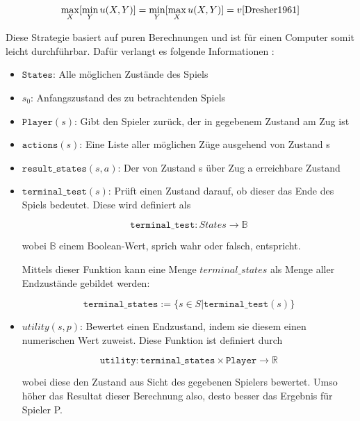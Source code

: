 \begin{equation}
\max\limits_X[\min\limits_Yu(X,Y)] = \min\limits_Y[\max\limits_Xu(X,Y)] = v \cite{Dresher1961}
\end{equation}

Diese Strategie basiert auf puren Berechnungen und ist für einen Computer somit leicht durchführbar. Dafür verlangt es folgende Informationen \cite{Stroetmann2018}:

\begin{itemize}
\item \textbf{$\mathtt{States}$}: Alle möglichen Zustände des Spiels
\item \textbf{$s_0$}: Anfangszustand des zu betrachtenden Spiels
\item \textbf{$\mathtt{Player}(s)$}: Gibt den Spieler zurück, der in gegebenem Zustand am Zug ist
\item \textbf{$\mathtt{actions}(s)$}: Eine Liste aller möglichen Züge ausgehend von Zustand s
\item \textbf{$\mathtt{result\_states}(s,a)$}: Der von Zustand s über Zug a erreichbare Zustand
\item \textbf{$\mathtt{terminal\_test}(s)$}: Prüft einen Zustand darauf, ob dieser das Ende des Spiels bedeutet. Diese wird definiert als

\begin{equation}
\mathtt{terminal\_test} : States \rightarrow \mathbb{B}
\end{equation}

wobei $\mathbb{B}$ einem Boolean-Wert, sprich wahr oder falsch, entspricht.

Mittels dieser Funktion kann eine Menge $terminal\_states$ als Menge aller Endzustände gebildet werden:

\begin{equation}
\mathtt{terminal\_states} := \{s \in S | \mathtt{terminal\_test}(s)\}
\end{equation}

\item \textbf{$utility(s, p)$}: Bewertet einen Endzustand, indem sie diesem einen numerischen Wert zuweist. Diese Funktion ist definiert durch

\begin{equation}
\mathtt{utility} : \mathtt{terminal\_states} \times \mathtt{Player} \rightarrow \mathbb{R}
\end{equation}

wobei diese den Zustand aus Sicht des gegebenen Spielers bewertet. Umso höher das Resultat dieser Berechnung also, desto besser das Ergebnis für Spieler P.
\end{itemize}

